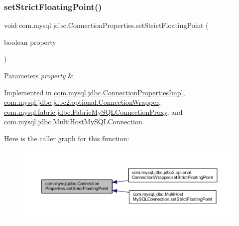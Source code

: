 \subsubsection{\texorpdfstring{set\+Strict\+Floating\+Point()}{setStrictFloatingPoint()}}
{\footnotesize\ttfamily void com.\+mysql.\+jdbc.\+Connection\+Properties.\+set\+Strict\+Floating\+Point (\begin{DoxyParamCaption}\item[{boolean}]{property }\end{DoxyParamCaption})}


\begin{DoxyParams}{Parameters}
{\em property} & \\
\hline
\end{DoxyParams}


Implemented in \mbox{\hyperlink{classcom_1_1mysql_1_1jdbc_1_1_connection_properties_impl_a015c113b8264ed8c7e876da6dabdd45d}{com.\+mysql.\+jdbc.\+Connection\+Properties\+Impl}}, \mbox{\hyperlink{classcom_1_1mysql_1_1jdbc_1_1jdbc2_1_1optional_1_1_connection_wrapper_a1549974fcca3a76425ac6155e2ae77c8}{com.\+mysql.\+jdbc.\+jdbc2.\+optional.\+Connection\+Wrapper}}, \mbox{\hyperlink{classcom_1_1mysql_1_1fabric_1_1jdbc_1_1_fabric_my_s_q_l_connection_proxy_aef128837e0d751b5e31d33c7166821e7}{com.\+mysql.\+fabric.\+jdbc.\+Fabric\+My\+S\+Q\+L\+Connection\+Proxy}}, and \mbox{\hyperlink{classcom_1_1mysql_1_1jdbc_1_1_multi_host_my_s_q_l_connection_a8953dad452ece9ae8a1f2d3cec6ca4ab}{com.\+mysql.\+jdbc.\+Multi\+Host\+My\+S\+Q\+L\+Connection}}.

Here is the caller graph for this function\+:\nopagebreak
\begin{figure}[H]
\begin{center}
\leavevmode
\includegraphics[width=350pt]{interfacecom_1_1mysql_1_1jdbc_1_1_connection_properties_afbb6b6808923b1d248ce45db64bafb28_icgraph}
\end{center}
\end{figure}
\mbox{\label{interfacecom_1_1mysql_1_1jdbc_1_1_connection_properties_a6b1583c38f50feb05d85d5f8357a998c}} 
